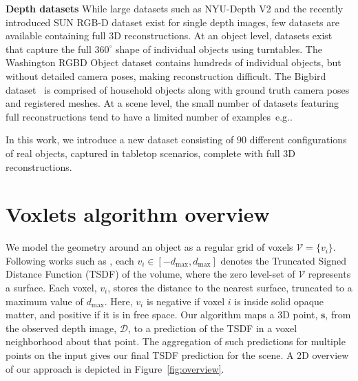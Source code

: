\documentclass[10pt,twocolumn,letterpaper]{article}
\makeatletter
\renewcommand*{\eg}{e.g.\@\xspace}
\newcommand{\rgbdimage}{\mathcal{D}}
\newcommand{\pixelidx}{\mathbf{s}}
\newcommand{\voxelgrid}{\mathcal{V}}
\newcommand{\voxel}{v}
\newcommand{\voxidx}{i}
\renewcommand{\paragraph}{\vspace{2pt}\noindent\textbf}
\makeatother
\begin{document}
\paragraph{Depth datasets}\newline
While large datasets such as NYU-Depth V2 \cite{silberman-eccv-2012} and the recently introduced SUN RGB-D dataset \cite{SUNRGBD} exist for single depth images, few datasets are available containing full 3D reconstructions.
At an object level, datasets exist that capture the full $360^{\circ}$ shape of individual objects using turntables.
The Washington RGBD Object dataset \cite{lai2011large, lai2014unsupervised} contains hundreds of individual objects, but without detailed camera poses, making reconstruction difficult.
The Bigbird dataset~\cite{singh-icra-2014} is comprised of household objects along with ground truth camera poses and registered meshes.
At a scene level, the small number of datasets featuring full reconstructions tend to have a limited number of examples~\eg \cite{shotton2013scene}.

In this work, we introduce a new dataset consisting of $90$ different configurations of real objects, captured in tabletop scenarios, complete with full 3D reconstructions.






\section{Voxlets algorithm overview}


\newcommand{\voxregion}{\mathcal{R}}

We model the geometry around an object as a regular grid of voxels $\voxelgrid = \{\voxel_\voxidx\}$.
Following works such as \cite{curless1996volumetric, izadi-uist-2011, prisacariu-iccv-2011}, each $\voxel_\voxidx \in [-d_{\max}, d_{\max}]$ denotes the Truncated Signed Distance Function (TSDF) of the volume, where the zero level-set of $\voxelgrid$ represents a surface.
Each voxel, $\voxel_\voxidx$, stores the distance to the nearest surface, truncated to a maximum value of $d_{\max}$.
Here, $\voxel_\voxidx$ is negative if voxel $\voxidx$ is inside solid opaque matter, and positive if it is in free space.
Our algorithm maps a 3D point, $\pixelidx$, from the observed depth image, $\rgbdimage$, to a prediction of the TSDF in a voxel neighborhood about that point.
The aggregation of such predictions for multiple points on the input gives our final TSDF prediction for the scene.
A 2D overview of our approach is depicted in Figure~\ref{fig:overview}.
\end{document}
